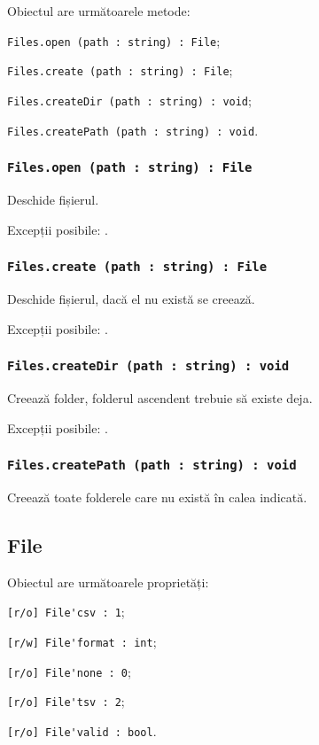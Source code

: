 Obiectul \files{} are următoarele metode:
\begin{icItems}
	\item \lstinline|Files.open (path : string) : File|;
	\item \lstinline|Files.create (path : string) : File|;
	\item \lstinline|Files.createDir (path : string) : void|;
	\item \lstinline|Files.createPath (path : string) : void|.
\end{icItems}

\subsubsection{\lstinline|Files.open (path : string) : File|}

Deschide fișierul.

Excepții posibile: .

\subsubsection{\lstinline|Files.create (path : string) : File|}

Deschide fișierul, dacă el nu există se creează.

Excepții posibile: .

\subsubsection{\lstinline|Files.createDir (path : string) : void|}

Creează folder, folderul ascendent trebuie să existe deja.

Excepții posibile: .

\subsubsection{\lstinline|Files.createPath (path : string) : void|}

Creează toate folderele care nu există în calea indicată.

\subsection{{\color{orange} File}}

Obiectul \file{} are următoarele proprietăți:
\begin{icItems}
	\item \lstinline|[r/o] File'csv : 1|;
	\item \lstinline|[r/w] File'format : int|;
	\item \lstinline|[r/o] File'none : 0|;
	\item \lstinline|[r/o] File'tsv : 2|;
	\item \lstinline|[r/o] File'valid : bool|.
\end{icItems}

